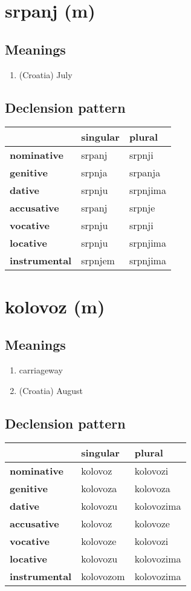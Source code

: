 \filbreak
\section{srpanj (m)}
\subsection*{Meanings}
\begin{enumerate}
\item (Croatia) July
\end{enumerate}
\subsection*{Declension pattern}
\begin{tabularx}{\linewidth}{Xll}
\toprule
{} & singular &    plural \\
\midrule
\textbf{nominative  } &   srpanj &    srpnji \\
\textbf{genitive    } &   srpnja &   srpanja \\
\textbf{dative      } &   srpnju &  srpnjima \\
\textbf{accusative  } &   srpanj &    srpnje \\
\textbf{vocative    } &   srpnju &    srpnji \\
\textbf{locative    } &   srpnju &  srpnjima \\
\textbf{instrumental} &  srpnjem &  srpnjima \\
\bottomrule
\end{tabularx}

\filbreak
\section{kolovoz (m)}
\subsection*{Meanings}
\begin{enumerate}
\item carriageway
\item (Croatia) August
\end{enumerate}
\subsection*{Declension pattern}
\begin{tabularx}{\linewidth}{Xll}
\toprule
{} &   singular &      plural \\
\midrule
\textbf{nominative  } &    kolovoz &    kolovozi \\
\textbf{genitive    } &   kolovoza &    kolovoza \\
\textbf{dative      } &   kolovozu &  kolovozima \\
\textbf{accusative  } &    kolovoz &    kolovoze \\
\textbf{vocative    } &   kolovoze &    kolovozi \\
\textbf{locative    } &   kolovozu &  kolovozima \\
\textbf{instrumental} &  kolovozom &  kolovozima \\
\bottomrule
\end{tabularx}

